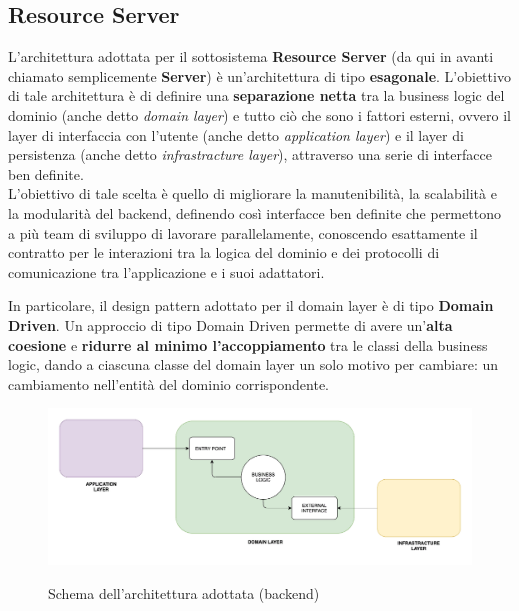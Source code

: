         \subsection{Resource Server}
            L'architettura adottata per il sottosistema \textbf{Resource Server} (da qui in avanti chiamato semplicemente \textbf{Server}) è un'architettura di tipo \textbf{esagonale}. L'obiettivo di tale architettura è di definire una \textbf{separazione netta} tra la business logic del dominio (anche detto \textit{domain layer}) e tutto ciò che sono i fattori esterni, ovvero il layer di interfaccia con l'utente (anche detto \textit{application layer}) e il layer di persistenza (anche detto \textit{infrastracture layer}), attraverso una serie di interfacce ben definite. \\
            L'obiettivo di tale scelta è quello di migliorare la manutenibilità, la scalabilità e la modularità del backend, definendo così interfacce ben definite che permettono a più team di sviluppo di lavorare parallelamente, conoscendo esattamente il contratto per le interazioni tra la logica del dominio e dei protocolli di comunicazione tra l'applicazione e i suoi adattatori. \cite{AppMaster1}
            
            In particolare, il design pattern adottato per il domain layer è di tipo \textbf{Domain Driven}. Un approccio di tipo Domain Driven permette di avere un'\textbf{alta coesione} e \textbf{ridurre al minimo l'accoppiamento} tra le classi della business logic, dando a ciascuna classe del domain layer un solo motivo per cambiare: un cambiamento nell'entità del dominio corrispondente.
            \begin{figure}[htbp!]
                \centering
                \includegraphics[width=1\linewidth]{Immagini/Object Design/DDD-Layers.jpg}
                \caption{Schema dell'architettura adottata (backend)}
                \cite{Baeldung1}
            \end{figure}


